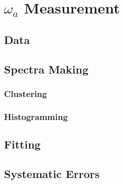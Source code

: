 \chapter{$\omega_{a}$ Measurement}
\label{chapter:SpinPrecessionMeasurement}
\thispagestyle{myheadings} %

\section{Data}
\label{sec:Data}

\section{Spectra Making}
\label{sec:Spectra Making}

\subsection{Clustering}
\label{sec:Clustering}

\subsection{Histogramming}
\label{sec:Histogramming}

\section{Fitting}
\label{sec:Fitting}

\section{Systematic Errors}
\label{sec:Systematic Errors}
